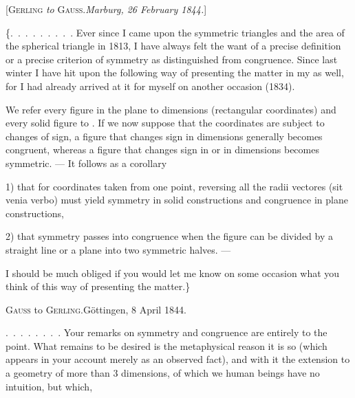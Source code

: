 %
\begin{center}
[\textsc{Gerling} \emph{to} \textsc{Gauss}.\quad \emph{Marburg, 26 February 1844.}]
\end{center}

\{\mbox{.\ .\ .\ .\ .\ .\ .\ .\ .} Ever since I came upon the symmetric triangles and the area of the spherical triangle in 1813, I have always felt the want of a precise definition or a precise criterion of symmetry as distinguished from congruence. Since last winter I have hit upon the following way of presenting the matter in my  as well, for I had already arrived at it for myself on another occasion (1834).

We refer every figure in the plane to  dimensions (rectangular coordinates) and every solid figure to . If we now suppose that the coordinates are subject to changes of sign, a figure that changes sign in  dimensions generally becomes congruent, whereas a figure that changes sign in  or in  dimensions becomes symmetric. --- It follows as a corollary

1) that for coordinates taken from one point, reversing all the radii vectores (sit venia verbo) must yield symmetry in solid constructions and congruence in plane constructions,

2) that symmetry passes into congruence when the figure can be divided by a straight line or a plane into two symmetric halves. ---

I should be much obliged if you would let me know on some occasion what you think of this way of presenting the matter.\}

\par\bigskip

\begin{center}
\textsc{Gauss} to \textsc{Gerling}.\quad Göttingen, 8 April 1844.
\end{center}

\mbox{.\ .\ .\ .\ .\ .\ .\ .} Your remarks on symmetry and congruence are entirely to the point. What remains to be desired is the metaphysical reason  it is so (which appears in your account merely as an observed fact), and with it the extension to a geometry of more than 3 dimensions, of which we human beings have no intuition, but which,\space%
